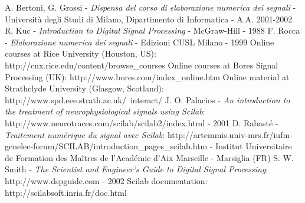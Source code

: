                                                                            
%

\begin{thebibliography}{99}
 A. Bertoni, G. Grossi - \emph{Dispensa del corso di elaborazione numerica dei segnali} - Universit\`a degli Studi di Milano, Dipartimento di Informatica - A.A. 2001-2002
 R. Kuc - \emph{Introduction to Digital Signal Processing} - McGraw-Hill - 1988
 F. Rocca - \emph{Elaborazione numerica dei segnali} - Edizioni CUSL Milano - 1999
 Online courses at Rice University (Houston, US): http://cnx.rice.edu/content/browse\_courses
 Online courses at Bores Signal Processing (UK): http://www.bores.com/index\_online.htm
 Online material at Strathclyde University (Glasgow, Scotland): http://www.spd.eee.strath.ac.uk/~interact/
 J. O. Palacios - \emph{An introduction to the treatment of neurophysiological signals using Scilab}: http://www.neurotraces.com/scilab/scilab2/index.html - 2001
 D. Rabast\'e - \emph{Traitement num\'erique du signal avec Scilab}: http://artemmis.univ-mrs.fr/iufm-genelec-forum/SCILAB/introduction\_pages\_scilab.htm - Institut Universitaire de Formation des Ma\^itres de l'Acad\'emie d'Aix Marseille - Marsiglia (FR)
 S. W. Smith - \emph{The Scientist and Engineer's Guide to Digital Signal Processing}: http://www.dspguide.com - 2002
 Scilab documentation: http://scilabsoft.inria.fr/doc.html 
\end{thebibliography}
%
